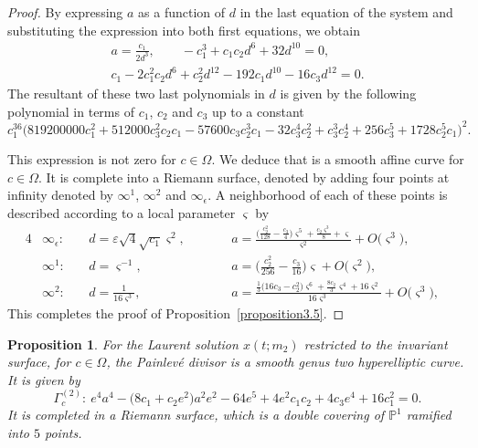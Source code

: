 \documentclass[pdftex]{sigma}
\numberwithin{equation}{section}
\newtheorem{Proposition}[Theorem]{Proposition}
 { \theoremstyle{definition}
\newtheorem{Definition}[Theorem]{Definition}
\newtheorem{Note}[Theorem]{Note}
\newtheorem{Example}[Theorem]{Example}
\newtheorem{Remark}[Theorem]{Remark} }
\begin{document}
\begin{proof}
By expressing $a$ as a function of $d$ in the last equation of the
system and substituting the expression into both first equations, we
obtain
\begin{gather*}
a=\frac{c_1}{2d^3}, \qquad -c_1^3+c_1c_2d^6+32d^{10}=0, \\
c_1-2c_1^2c_2d^6+c_2^2d^{12}-192c_1d^{10}-16c_3d^{12}=0.
\end{gather*}
 The resultant of these two last polynomials in $d$ is given by the following polynomial in terms of $c_1$,
$c_2$ and $c_3$ up to a constant
\[c_1^{36}\bigl(819200000c_1^2+512000c_3^2c_2c_1-57600c_3c_2^3c_1-32c_3^4c_2^2+c_3^3c_2^4+256c_3^5+1728c_2^5c_1\bigr)^2.
\]

This expression is not zero for $c \in \Omega$. We deduce that
 is a smooth affine curve for $c \in
\Omega$. It is complete into a Riemann surface, denoted
 by adding four points at
infinity denoted by $\infty^{1}$, $\infty^{2}$ and
$\infty_{\epsilon}$. A neighborhood of each of these points is
described according to a local parameter $\varsigma$ by
\begin{alignat}{4}
&\infty_{\epsilon}\colon \ && d =\varepsilon\sqrt{4}\sqrt{c_1}\varsigma^2,\qquad&&
a =\frac{\bigl( \frac { c_2^2}{128}-\frac{c_3}{4} \bigr)\varsigma^5 +\frac{c_2\varsigma^3}{8} +\varsigma}{\varsigma^2} +O\bigl(\varsigma^3\bigr),&\label{valeurde_inftyvarepsilon_D1}\\
&\infty^1\colon \ && d =\varsigma^{-1},\qquad &&
a=\biggl( \frac {c_2^{2}}{256} -\frac{c_3}{16}\biggr)\varsigma+O\bigl(\varsigma^2\bigr),&\label{valeurde_infty1_D1}\\
&\infty^2\colon \ && d =\frac{1}{16\varsigma^3},\qquad&&
a=\frac{\frac{1}{3} \bigl(16c_3-c_2^2\bigr)\varsigma^{6} +\frac{8c_2}{3}\varsigma^{4}+16\varsigma^{2}}{16{\varsigma}^{3}} +O\bigl(\varsigma^3\bigr),&\label{valeurde_infty2_D1}
\end{alignat}
This completes the proof of Proposition~\ref{proposition3.5}.
\end{proof}

\begin{Proposition}
For the Laurent solution $x(t;m_2)$ restricted to the
invariant surface, for $c \in \Omega$, the Painlev\'e divisor
 is a smooth genus two hyperelliptic
curve. It is given by
\begin{equation*}
 \Gamma_c^{(2)}\colon \ e^4a^4-\bigl(8c_1+c_2e^2\bigr)a^2e^2-64e^5+4e^2c_1c_2+4c_3e^4+16c_1^2=0.
\end{equation*}
It is completed in a Riemann surface, which is a double covering of
$\mathbb{P}^1$ ramified into $5$ points.
\end{Proposition}
\end{document}
